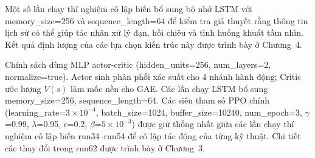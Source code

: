 Một số lần chạy thí nghiệm cô lập biến bổ sung bộ nhớ LSTM với memory\_size=256 và sequence\_length=64 để kiểm tra giả thuyết rằng thông tin lịch sử có thể giúp tác nhân xử lý đạn, hồi chiêu và tình huống khuất tầm nhìn. Kết quả định lượng của các lựa chọn kiến trúc này được trình bày ở Chương~4.

Chính sách dùng MLP actor-critic (hidden\_units=256, num\_layers=2, normalize=true). Actor sinh phân phối xác suất cho 4 nhánh hành động; Critic ước lượng $V(s)$ làm mốc nền cho GAE. Các lần chạy LSTM bổ sung memory\_size=256, sequence\_length=64. Các siêu tham số PPO chính (learning\_rate=$3\times10^{-4}$, batch\_size=1024, buffer\_size=10240, num\_epoch=3, $\gamma$=0.99, $\lambda$=0.95, $\epsilon$=0.2, $\beta$=$5\times10^{-3}$) được giữ thống nhất giữa các lần chạy thí nghiệm cô lập biến run34--run54 để cô lập tác động của từng kỹ thuật. Chi tiết các thay đổi trong run62 được trình bày ở Chương~3.
